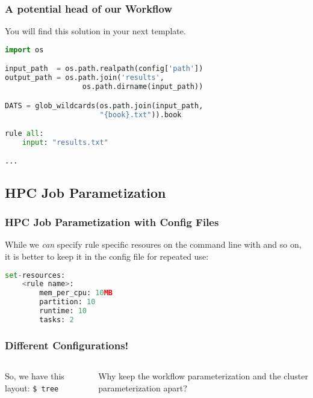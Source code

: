 \begin{frame}[fragile]
  \frametitle{A potential head of our Workflow}
  You will find this solution in your next template.
  \begin{lstlisting}[language=Python,style=Python, basicstyle=\small]
import os

input_path  = os.path.realpath(config['path'])
output_path = os.path.join('results', 
                  os.path.dirname(input_path))

DATS = glob_wildcards(os.path.join(input_path, 
                      "{book}.txt")).book

rule all:
    input: "results.txt"

...
  \end{lstlisting}
\end{frame}

\subsection{HPC Job Parametization}

\begin{frame}[fragile]
  \frametitle{HPC Job Parametization with Config Files}
  While we \emph{can} specify rule specific resoures on the command line with  and so on, it is better to keep it in the config file for repeated use:
  \begin{lstlisting}[language=Python,style=Python]
set-resources:
    <rule name>:
        mem_per_cpu: 10MB
        partition: 10
        runtime: 10
        tasks: 2
  \end{lstlisting}
\end{frame}

\begin{frame}
  \frametitle{Different Configurations!}
  \begin{columns}
    \begin{column}{0.5\textwidth}
        So, we have this layout:
              {\tiny \DTsetlength{0.2em}{1em}{0.2em}{0.4pt}{.6pt}
\texttt{\$ tree}
}
    \end{column}
    \begin{column}{0.5\textwidth}
      \begin{question}
      	Why keep the workflow parameterization and the cluster parameterization apart?
      \end{question}
      \pause
    \end{column}
  \end{columns}
\end{frame}

